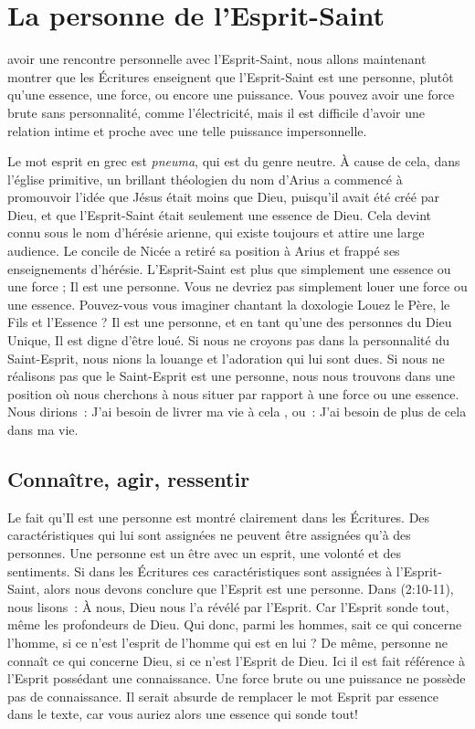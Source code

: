 \chapter{La personne de l'Esprit-Saint}

 avoir une rencontre personnelle avec
 l'Esprit-Saint, nous allons maintenant montrer que les Écritures enseignent
 que l'Esprit-Saint est une personne, plutôt qu'une essence, une force, ou
 encore une puissance. Vous pouvez avoir une force brute sans personnalité,
 comme l'électricité, mais il est difficile d'avoir une relation intime et
 proche avec une telle puissance impersonnelle.

Le mot \og esprit \fg{} en grec est \emph{pneuma}, qui est du genre neutre.
 À cause de cela, dans l'église primitive, un brillant théologien du nom
 d'Arius a commencé à promouvoir l'idée que Jésus était moins que Dieu,
 puisqu'il avait été créé par Dieu, et que l'Esprit-Saint était seulement
 une \og essence \fg{} de Dieu. Cela devint connu sous le nom d'hérésie
 arienne, qui existe toujours et attire une large audience. Le concile de
 Nicée a retiré sa position à Arius et frappé ses enseignements d'hérésie.
 L'Esprit-Saint est plus que simplement une essence ou une force ; Il est
 une personne. Vous ne devriez pas simplement louer une force ou une essence.
 Pouvez-vous vous imaginer chantant la doxologie \og Louez le Père, le Fils
 et l'Essence \fg{} ? Il est une personne, et en tant qu'une des personnes
 du Dieu Unique, Il est digne d'être loué. Si nous ne croyons pas dans la
 personnalité du Saint-Esprit, nous nions la louange et l'adoration qui lui
 sont dues. Si nous ne réalisons pas que le Saint-Esprit est une personne,
 nous nous trouvons dans une position où nous cherchons à nous situer par
 rapport à une force ou une essence. Nous dirions~: \og J'ai besoin de livrer
 ma vie à cela \fg{}, ou~: \og J'ai besoin de plus de cela dans ma vie.\fg


\section*{Connaître, agir, ressentir}

Le fait qu'Il est une personne est montré clairement dans les Écritures.
 Des caractéristiques qui lui sont assignées ne peuvent être assignées
 qu'à des personnes. Une personne est un être avec un esprit, une volonté et
 des sentiments. Si dans les Écritures ces caractéristiques sont assignées à
 l'Esprit-Saint, alors nous devons conclure que l'Esprit est une personne.
 Dans (2:10-11), nous lisons~: \og À nous, Dieu nous l'a
 révélé par l'Esprit. Car l'Esprit sonde tout, même les profondeurs de Dieu.
 Qui donc, parmi les hommes, sait ce qui concerne l'homme, si ce n'est
 l'esprit de l'homme qui est en lui ? De même, personne ne connaît ce qui
 concerne Dieu, si ce n'est l'Esprit de Dieu. \fg{} Ici il est fait référence
 à l'Esprit possédant une connaissance. Une force brute ou une puissance ne
 possède pas de connaissance. Il serait absurde de remplacer le mot
 \og Esprit \fg{} par \og essence \fg{} dans le texte, car vous auriez alors
 une \og essence \fg{} qui sonde tout!

